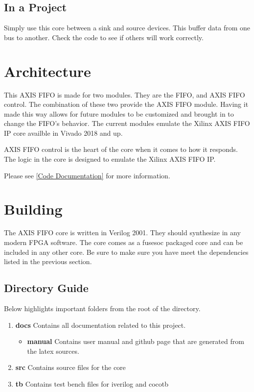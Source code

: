 \subsection{In a Project}
\par
Simply use this core between a sink and source devices. This buffer data from one bus to another. Check the code to see if others will work correctly.

\section{Architecture}

\par
This AXIS FIFO is made for two modules. They are the FIFO, and AXIS FIFO control. The combination of these two provide the AXIS FIFO module.
Having it made this way allows for future modules to be customized and brought in to change the FIFO's behavior. The current modules emulate the Xilinx
AXIS FIFO IP core availble in Vivado 2018 and up.

\par
AXIS FIFO control is the heart of the core when it comes to how it responds. The logic in the core is designed to emulate the Xilinx AXIS FIFO IP.

Please see \ref{Code Documentation} for more information.

\section{Building}

\par
The AXIS FIFO core is written in Verilog 2001. They should synthesize in any modern FPGA software. The core comes as a fusesoc packaged core and can be
included in any other core. Be sure to make sure you have meet the dependencies listed in the previous section.

\subsection{Directory Guide}

\par
Below highlights important folders from the root of the directory.

\begin{enumerate}
  \item \textbf{docs} Contains all documentation related to this project.
    \begin{itemize}
      \item \textbf{manual} Contains user manual and github page that are generated from the latex sources.
    \end{itemize}
  \item \textbf{src} Contains source files for the core
  \item \textbf{tb} Contains test bench files for iverilog and cocotb
\end{enumerate}

